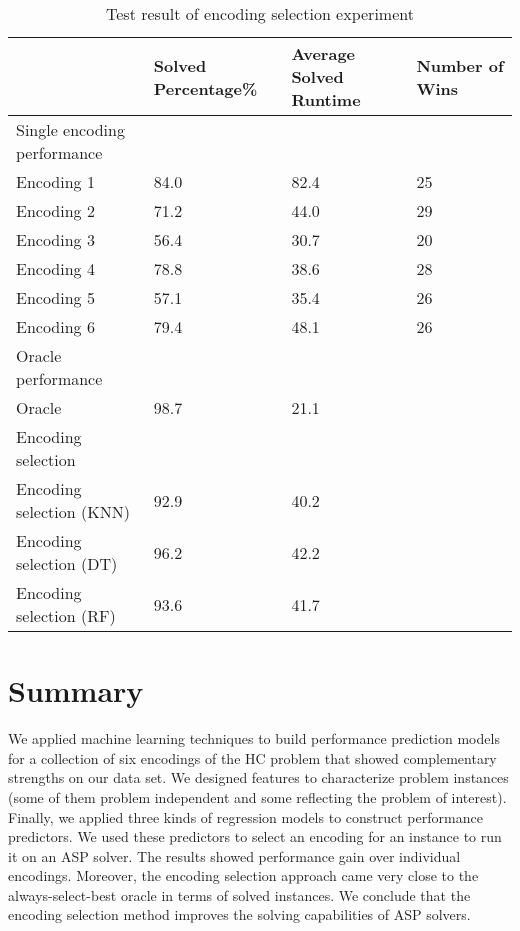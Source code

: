 \documentclass[submission,copyright,creativecommons]{eptcs}
\begin{document}
\begin{table}
\caption{Test result of encoding selection experiment } \label{ecresult1}
\centering
\footnotesize{
\begin{tabular}{llll}
\hline\hline
%
                  & Solved Percentage\% & Average Solved Runtime & Number of Wins \\ \hline%
Single encoding performance & & &                                     \\ %
Encoding 1        & 84.0           & 82.4                      & 25            \\ %
Encoding 2        & 71.2           & 44.0                      & 29            \\ %
Encoding 3        & 56.4           & 30.7                       & 20            \\ %
Encoding 4        & 78.8           & 38.6                      & 28            \\ %
Encoding 5        & 57.1           & 35.4                      & 26            \\ %
Encoding 6        & 79.4           & 48.1                      & 26            \\\hline %
Oracle performance  & & &                                               \\ %
Oracle            & 98.7           & 21.1                      &               \\ \hline
Encoding selection & & &                                                \\ %
Encoding selection (KNN) & 92.9          & 40.2                    &               \\ %
Encoding selection (DT) & 96.2&42.2       &               \\ %
Encoding selection (RF) & 93.6&41.7	      &               \\ %
\hline\hline
\end{tabular}}
\centering
\end{table}



\section{Summary}
We applied machine learning techniques to build performance prediction models
for a collection of six encodings of the HC problem that showed complementary 
strengths on our data set. We designed features to characterize problem 
instances (some of them problem independent and some reflecting the problem of 
interest). Finally, we applied three kinds of regression models to construct 
performance predictors. We used these predictors to select an encoding 
for an instance to run it on an ASP solver. The results showed performance
gain over individual encodings. Moreover, the encoding selection approach
came very close to the always-select-best oracle in terms of solved instances.
We conclude that the encoding selection method improves the solving 
capabilities of ASP solvers.
\end{document}
